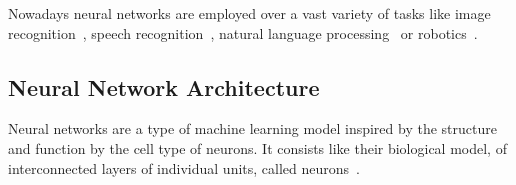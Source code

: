 Nowadays neural networks are employed over a vast variety of tasks like image recognition~\cite{VGG16}, speech recognition~\cite{DL_SpeechRecognition}, natural language processing~\cite{DL_NLP} or robotics~\cite{DL_Robotics}. 

\subsection{Neural Network Architecture}


Neural networks are a type of machine learning model inspired by the structure and function by the cell type of neurons. It consists like their biological model, of interconnected layers of individual units, called neurons~\cite{DeepLearningTextBook}.

